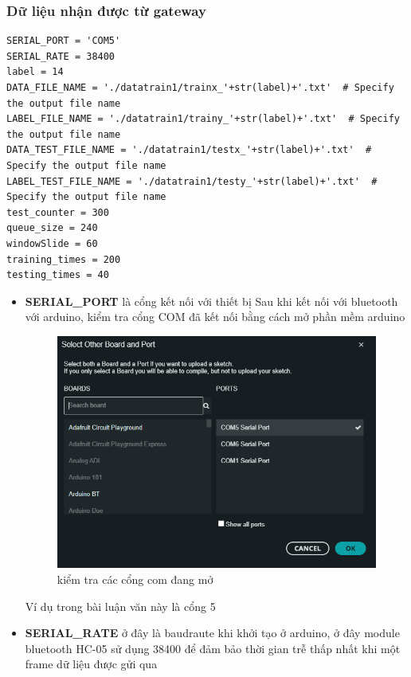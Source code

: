\subsubsection{Dữ liệu nhận được từ gateway}
\begin{lstlisting}
SERIAL_PORT = 'COM5'
SERIAL_RATE = 38400
label = 14
DATA_FILE_NAME = './datatrain1/trainx_'+str(label)+'.txt'  # Specify the output file name
LABEL_FILE_NAME = './datatrain1/trainy_'+str(label)+'.txt'  # Specify the output file name
DATA_TEST_FILE_NAME = './datatrain1/testx_'+str(label)+'.txt'  # Specify the output file name
LABEL_TEST_FILE_NAME = './datatrain1/testy_'+str(label)+'.txt'  # Specify the output file name
test_counter = 300
queue_size = 240
windowSlide = 60
training_times = 200
testing_times = 40
\end{lstlisting}
\begin{itemize}

\item\textbf{SERIAL\_PORT} là cổng kết nối với thiết bị
Sau khi kết nối với bluetooth với arduino, kiểm tra cổng COM đã kết nối bằng cách mở phần mềm arduino

\begin{figure}[H]
    \centering
    \includegraphics[width=\textwidth,height=\textheight,keepaspectratio]{Images/SystemImpl/checkcomport.png}
    \caption{kiểm tra các cổng com đang mở}
    \label{fig:enter-label}
\end{figure}

Ví dụ trong bài luận văn này là cổng 5 \\

\item\textbf{SERIAL\_RATE} ở đây là baudraute khi khởi tạo ở arduino, ở đây module bluetooth HC-05 sử dụng 38400 để đảm bảo thời gian trễ thấp nhất khi một frame dữ liệu được gửi qua\\


\end{itemize}
